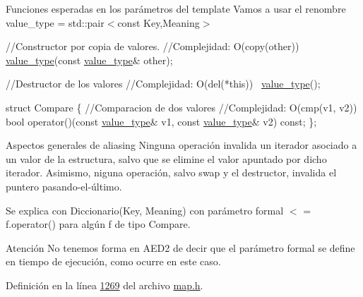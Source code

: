 \begin{DoxyParagraph}{Funciones esperadas en los parámetros del template}
Vamos a usar el renombre value\-\_\-type = std\-::pair$<$const Key,\-Meaning$>$


\begin{DoxyCode}
\textcolor{comment}{//Constructor por copia de valores.}
\textcolor{comment}{//Complejidad: O(copy(other))}
\hyperlink{classaed2_1_1map_a719db98e0ff9a837610f76be33264680_a719db98e0ff9a837610f76be33264680}{value\_type}(\textcolor{keyword}{const} \hyperlink{classaed2_1_1map_a719db98e0ff9a837610f76be33264680_a719db98e0ff9a837610f76be33264680}{value\_type}& other);

\textcolor{comment}{//Destructor de los valores}
\textcolor{comment}{//Complejidad: O(del(*this))}
~\hyperlink{classaed2_1_1map_a719db98e0ff9a837610f76be33264680_a719db98e0ff9a837610f76be33264680}{value\_type}();

\textcolor{keyword}{struct }Compare \{
  \textcolor{comment}{//Comparacion de dos valores}
  \textcolor{comment}{//Complejidad: O(cmp(v1, v2))}
  \textcolor{keywordtype}{bool} operator()(\textcolor{keyword}{const} \hyperlink{classaed2_1_1map_a719db98e0ff9a837610f76be33264680_a719db98e0ff9a837610f76be33264680}{value\_type}& v1, \textcolor{keyword}{const} \hyperlink{classaed2_1_1map_a719db98e0ff9a837610f76be33264680_a719db98e0ff9a837610f76be33264680}{value\_type}& v2) \textcolor{keyword}{const};
\};
\end{DoxyCode}
 
\end{DoxyParagraph}


\begin{DoxyParagraph}{Aspectos generales de aliasing}
Ninguna operación invalida un iterador asociado a un valor de la estructura, salvo que se elimine el valor apuntado por dicho iterador. Asimismo, niguna operación, salvo swap y el destructor, invalida el puntero pasando-\/el-\/último.
\end{DoxyParagraph}
\begin{DoxyParagraph}{Se explica con}
Diccionario(Key, Meaning) con parámetro formal $<$ = f.\-operator() para algún f de tipo Compare.
\end{DoxyParagraph}
\begin{DoxyAttention}{Atención}
No tenemos forma en A\-E\-D2 de decir que el parámetro formal se define en tiempo de ejecución, como ocurre en este caso. 
\end{DoxyAttention}


Definición en la línea \hyperlink{map_8h_source_l01269}{1269} del archivo \hyperlink{map_8h_source}{map.\-h}.




